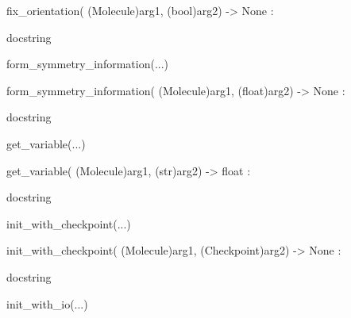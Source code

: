 \documentclass[letterpaper,10pt,english]{sphinxmanual}
\begin{document}
\begin{description}
\begin{description}
\begin{DUlineblock}{0em}
\begin{DUlineblock}{\DUlineblockindent}
\item[] fix\_orientation( (Molecule)arg1, (bool)arg2) -\textgreater{} None :
\item[]
\begin{DUlineblock}{\DUlineblockindent}
\item[] docstring
\item[] 
\end{DUlineblock}
\end{DUlineblock}
\item[] form\_symmetry\_information(...)
\item[]
\begin{DUlineblock}{\DUlineblockindent}
\item[] form\_symmetry\_information( (Molecule)arg1, (float)arg2) -\textgreater{} None :
\item[]
\begin{DUlineblock}{\DUlineblockindent}
\item[] docstring
\item[] 
\end{DUlineblock}
\end{DUlineblock}
\item[] get\_variable(...)
\item[]
\begin{DUlineblock}{\DUlineblockindent}
\item[] get\_variable( (Molecule)arg1, (str)arg2) -\textgreater{} float :
\item[]
\begin{DUlineblock}{\DUlineblockindent}
\item[] docstring
\item[] 
\end{DUlineblock}
\end{DUlineblock}
\item[] init\_with\_checkpoint(...)
\item[]
\begin{DUlineblock}{\DUlineblockindent}
\item[] init\_with\_checkpoint( (Molecule)arg1, (Checkpoint)arg2) -\textgreater{} None :
\item[]
\begin{DUlineblock}{\DUlineblockindent}
\item[] docstring
\item[] 
\end{DUlineblock}
\end{DUlineblock}
\item[] init\_with\_io(...)

\end{DUlineblock}
\end{description}
\end{description}
\end{document}
